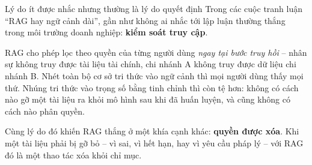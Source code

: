 \begin{deepdive}{Lý do ít được nhắc nhưng thường là lý do quyết định}
Trong các cuộc tranh luận “RAG hay ngữ cảnh dài”, gần như không ai nhắc tới lập luận thường thắng trong môi trường doanh nghiệp: \textbf{kiểm soát truy cập}.

RAG cho phép lọc theo quyền của từng người dùng \emph{ngay tại bước truy hồi} -- nhân sự không truy được tài liệu tài chính, chi nhánh A không truy được dữ liệu chi nhánh B. Nhét toàn bộ cơ sở tri thức vào ngữ cảnh thì mọi người dùng thấy mọi thứ. Nhúng tri thức vào trọng số bằng tinh chỉnh thì còn tệ hơn: không có cách nào gỡ một tài liệu ra khỏi mô hình sau khi đã huấn luyện, và cũng không có cách nào phân quyền.

Cùng lý do đó khiến RAG thắng ở một khía cạnh khác: \textbf{quyền được xóa}. Khi một tài liệu phải bị gỡ bỏ -- vì sai, vì hết hạn, hay vì yêu cầu pháp lý -- với RAG đó là một thao tác xóa khỏi chỉ mục.
\end{deepdive}
